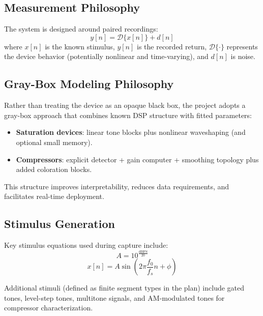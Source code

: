 \documentclass[11pt, letterpaper]{article}
\begin{document}
\subsection{Measurement Philosophy}

The system is designed around paired recordings:
\begin{equation}
    y[n] = \mathcal{D}\{x[n]\} + d[n]
\end{equation}
where $x[n]$ is the known stimulus, $y[n]$ is the recorded return, $\mathcal{D}\{\cdot\}$ represents the device behavior
(potentially nonlinear and time-varying), and $d[n]$ is noise.

\subsection{Gray-Box Modeling Philosophy}

Rather than treating the device as an opaque black box, the project adopts a gray-box approach
that combines known DSP structure with fitted parameters:

\begin{itemize}[leftmargin=1.5em]
    \item \textbf{Saturation devices}: linear tone blocks plus nonlinear waveshaping (and optional small memory).
    \item \textbf{Compressors}: explicit detector + gain computer + smoothing topology plus added coloration blocks.
\end{itemize}

This structure improves interpretability, reduces data requirements, and facilitates real-time deployment.

\subsection{Stimulus Generation}

Key stimulus equations used during capture include:
\begin{equation}
    A = 10^{\frac{\text{dBFS}}{20}}
\end{equation}
\begin{equation}
    x[n] = A \sin\!\left(2\pi \frac{f_0}{f_s} n + \phi\right)
\end{equation}

Additional stimuli (defined as finite segment types in the plan) include gated tones, level-step tones,
multitone signals, and AM-modulated tones for compressor characterization.
\end{document}
